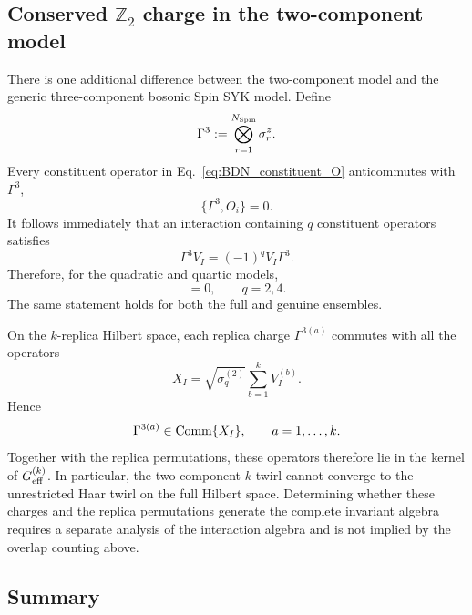 \documentclass{article}
\theoremstyle{definition}
\begin{document}
\subsection{Conserved $\mathbb Z_2$ charge in the two-component model}
\label{subsec:BDN_Z2_charge}

There is one additional difference between the two-component model and
the generic three-component bosonic Spin SYK model.  Define
\begin{equation}
    \Gamma^3
    :=
    \bigotimes_{r=1}^{N_{\rm Spin}}\sigma_r^z.
    \label{eq:BDN_Gamma3}
\end{equation}
Every constituent operator in Eq.~\eqref{eq:BDN_constituent_O}
anticommutes with $\Gamma^3$,
\begin{equation}
    \{\Gamma^3,O_i\}=0.
    \label{eq:BDN_Gamma_O}
\end{equation}
It follows immediately that an interaction containing $q$ constituent
operators satisfies
\begin{equation}
    \Gamma^3V_I
    =
    (-1)^qV_I\Gamma^3.
    \label{eq:BDN_Gamma_V}
\end{equation}
Therefore, for the quadratic and quartic models,
\begin{equation}
    [\Gamma^3,V_I]=0,
    \qquad
    q=2,4.
    \label{eq:BDN_even_q_charge}
\end{equation}
The same statement holds for both the full and genuine ensembles.

On the $k$-replica Hilbert space, each replica charge
$\Gamma^{3(a)}$ commutes with all the operators
\begin{equation}
    X_I
    =
    \sqrt{\sigma_q^{(2)}}
    \sum_{b=1}^kV_I^{(b)}.
\end{equation}
Hence
\begin{equation}
    \Gamma^{3(a)}
    \in
    {\rm Comm}\{X_I\},
    \qquad
    a=1,\ldots,k.
    \label{eq:BDN_replica_charge_commutant}
\end{equation}
Together with the replica permutations, these operators therefore lie in
the kernel of $G_{\rm eff}^{(k)}$.  In particular, the two-component
$k$-twirl cannot converge to the unrestricted Haar twirl on the full
Hilbert space.  Determining whether these charges and the replica
permutations generate the complete invariant algebra requires a separate
analysis of the interaction algebra and is not implied by the overlap
counting above.


\subsection{Summary}
\end{document}
